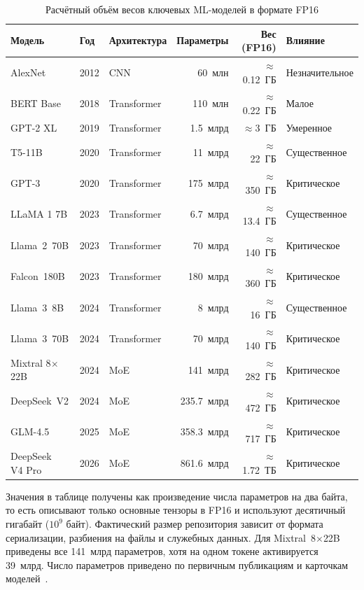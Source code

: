 \begin{table}[htbp]
\centering
\caption{Расчётный объём весов ключевых ML-моделей в формате FP16}
\label{tab:model_sizes}
\small
\begin{tabularx}{\textwidth}{lllrrX}
\toprule
Модель & Год & Архитектура & Параметры & Вес (FP16) & Влияние \\
\midrule
AlexNet          & 2012 & CNN         & 60~млн    & $\approx$0.12~ГБ & Незначительное \\
BERT Base        & 2018 & Transformer & 110~млн   & $\approx$0.22~ГБ & Малое \\
GPT-2 XL         & 2019 & Transformer & 1.5~млрд  & $\approx$3~ГБ    & Умеренное \\
T5-11B           & 2020 & Transformer & 11~млрд   & $\approx$22~ГБ   & Существенное \\
GPT-3            & 2020 & Transformer & 175~млрд  & $\approx$350~ГБ  & Критическое \\
LLaMA 1 7B       & 2023 & Transformer & 6.7~млрд  & $\approx$13.4~ГБ & Существенное \\
Llama~2~70B      & 2023 & Transformer & 70~млрд   & $\approx$140~ГБ  & Критическое \\
Falcon~180B      & 2023 & Transformer & 180~млрд  & $\approx$360~ГБ  & Критическое \\
Llama~3~8B       & 2024 & Transformer & 8~млрд    & $\approx$16~ГБ   & Существенное \\
Llama~3~70B      & 2024 & Transformer & 70~млрд   & $\approx$140~ГБ  & Критическое \\
\shortstack[l]{Mixtral\\8$\times$22B} & 2024 & MoE & 141~млрд & $\approx$282~ГБ & Критическое \\
DeepSeek~V2     & 2024 & MoE         & 235.7~млрд & $\approx$472~ГБ & Критическое \\
GLM-4.5         & 2025 & MoE         & 358.3~млрд & $\approx$717~ГБ & Критическое \\
\shortstack[l]{DeepSeek\\V4 Pro} & 2026 & MoE & 861.6~млрд & $\approx$1.72~ТБ & Критическое \\
\bottomrule
\end{tabularx}
\end{table}

Значения в таблице получены как произведение числа параметров на два байта, то есть описывают только основные тензоры в FP16 и используют десятичный гигабайт ($10^9$ байт). Фактический размер репозитория зависит от формата сериализации, разбиения на файлы и служебных данных. Для Mixtral~8$\times$22B приведены все 141~млрд параметров, хотя на одном токене активируется 39~млрд. Число параметров приведено по первичным публикациям и карточкам моделей~\cite{bert2018,gpt2_2019,t5_2020,gpt3_2020,llama1_2023,llama2_2023,falcon2023,llamapaper2024,mixtral2024,deepseekv2_2024,glm45_2025,deepseekv4_2026}.

